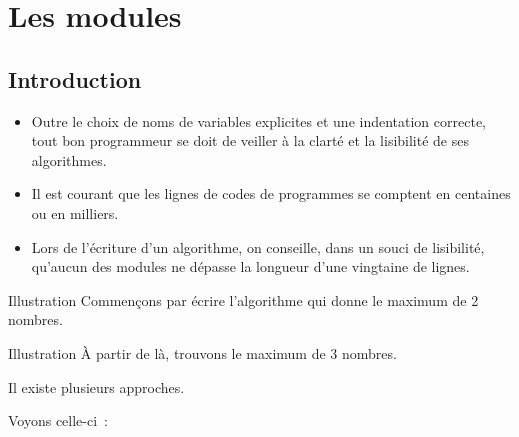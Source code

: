 \section{Les modules}

\subsection{Introduction}

\begin{frame}
	\begin{itemize}
	\item
	Outre le choix de noms de variables explicites et une indentation
	correcte, tout bon programmeur se doit de veiller à la clarté et la
	lisibilité de ses algorithmes.
	\item
	Il est courant que les lignes de codes de programmes se
	comptent en centaines ou en milliers.
	\item
	Lors de l’écriture d’un algorithme, on 
	conseille, dans un souci de lisibilité, qu’aucun des modules
	ne dépasse la longueur d’une vingtaine de lignes.
	\end{itemize}
\end{frame}

\begin{frame}{Illustration}
	Commençons par écrire l'algorithme qui donne le maximum de 2 nombres.

	\bigskip
	
\end{frame}

\begin{frame}{Illustration}
	À partir de là, trouvons le maximum de 3 nombres.
	
	\bigskip
	
	Il existe plusieurs approches. 
	
	\bigskip
	
	Voyons celle-ci~:

	\bigskip
	

\end{frame}

